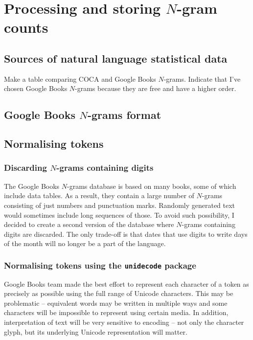 \documentclass{IIBproject}
\begin{document}
\section{Processing and storing $N$-gram counts}

\subsection{Sources of natural language statistical data}

Make a table comparing COCA and Google Books $N$-grams. Indicate that I've chosen Google Books $N$-grams because they are free and have a higher order.

\subsection{Google Books $N$-grams format}

\subsection{Normalising tokens}

\subsubsection{Discarding $N$-grams containing digits}

The Google Books $N$-grams database is based on many books, some of which include data tables. As a result, they contain a large number of $N$-grams consisting of just numbers and punctuation marks. Randomly generated text would sometimes include long sequences of those. To avoid such possibility, I decided to create a second version of the database where $N$-grams containing digits are discarded. The only trade-off is that dates that use digits to write days of the month will no longer be a part of the language.

\subsubsection{Normalising tokens using the \texttt{unidecode} package}

Google Books team made the best effort to represent each character of a token as precisely as possible using the full range of Unicode characters. This may be problematic -- equivalent words may be written in multiple ways and some characters will be impossible to represent using certain media. In addition, interpretation of text will be very sensitive to encoding -- not only the character glyph, but its underlying Unicode representation will matter.
\end{document}
